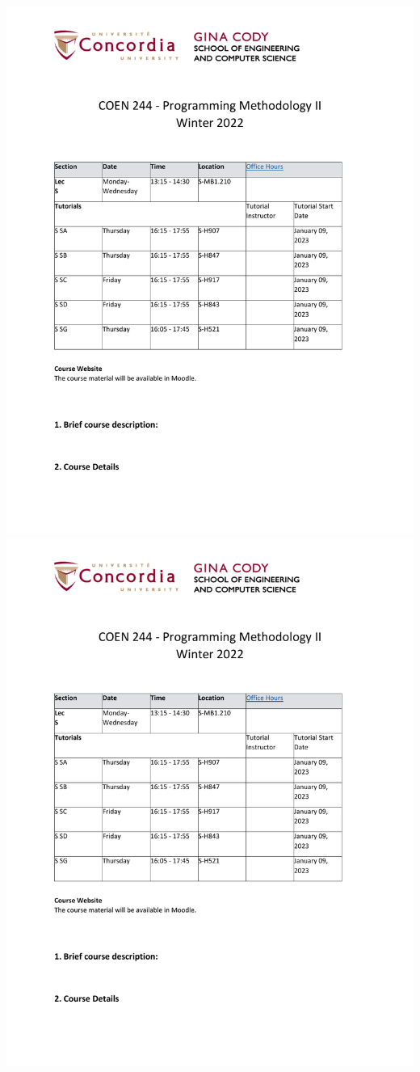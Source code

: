 \documentclass{CourseOutline}
\begin{document}
\includegraphics[page=4,rviewport=0.11 0.05 0.9 0.96, scale=0.95, clip=true]{2022_COEN244_4_S_1_outline.pdf}
\newpage
\includegraphics[page=5,rviewport=0.11 0.05 0.9 0.96, scale=0.95, clip=true]{2022_COEN244_4_S_1_outline.pdf}
\end{document}
